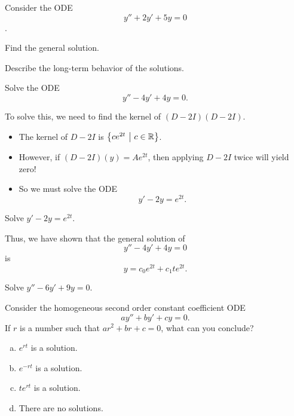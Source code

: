 \begin{applicationActivities}
\begin{activity}{15}
Consider the ODE \[y''+2y'+5y=0\].
\vfill
\begin{subactivity}
Find the general solution.
\end{subactivity}
\begin{subactivity}
Describe the long-term behavior of the solutions.
\end{subactivity}
\end{activity}


\begin{activity}{10}
Solve the ODE \[ y''-4y'+4y=0.\]
\end{activity}

\begin{observation}
To solve this, we need to find the kernel of \( (D-2I)(D-2I) \).
\begin{itemize}
\item The kernel of \(D-2I\) is \(\left\{ ce^{2t}\ \middle|\ c \in \mathbb{R} \right\}\).
\item However, if \( (D-2I)(y) = Ae^{2t} \), then applying \(D-2I\) twice will yield zero!
\item So we must solve the ODE \[y'-2y=e^{2t}.\]
\end{itemize}
\end{observation}

\begin{activity}{15}
Solve \(y'-2y=e^{2t}\).
\end{activity}


\begin{observation}
Thus, we have shown that the general solution of \[y''-4y'+4y=0\] is \[y=c_0e^{2t}+c_1te^{2t}.\]
\end{observation}

\begin{activity}{15}
Solve \(y''-6y'+9y=0\).
\end{activity}

\begin{activity}{10}
Consider the homogeneous second order constant coefficient ODE \[ay''+by'+cy=0.\]
If \(r\) is a number such that \(ar^2+br+c=0\), what can you conclude?
\begin{enumerate}[(a)]
\item \(e^{rt}\) is a solution.
\item \(e^{-rt}\) is a solution.
\item \(te^{rt}\) is a solution.
\item There are no solutions.
\end{enumerate}
\end{activity}


\end{applicationActivities}
